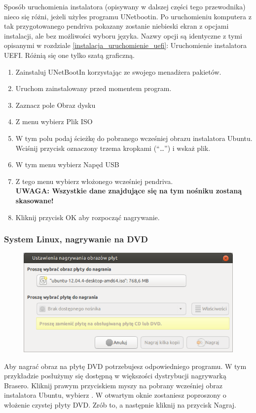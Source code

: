 Sposób uruchomienia instalatora (opisywany w dalszej części tego przewodnika) nieco się różni, jeżeli użyłes programu UNetbootin. Po uruchomieniu komputera z tak przygotowanego pendriva pokazany zostanie niebieski ekran z opcjami instalacji, ale bez możliwości wyboru języka. Nazwy opcji są identyczne z tymi opisanymi w rozdziale \ref{instalacja_uruchomienie_uefi}: Uruchomienie instalatora UEFI. Różnią się one tylko szatą graficzną.
\begin{enumerate}[label=\protect\circled{\arabic*}]
\item Zainstaluj UNetBootIn korzystając ze swojego menadżera pakietów.
\item Uruchom zainstalowany przed momentem program.
\item Zaznacz pole Obraz dysku
\item Z menu wybierz Plik ISO
\item W tym polu podaj ścieżkę do pobranego wcześniej obrazu instalatora Ubuntu. Wciśnij przycisk oznaczony trzema kropkami (“\ldots”) i wskaż plik.
\item W tym menu wybierz Napęd USB
\item Z tego menu wybierz włożonego wcześniej pendriva.\\
\textbf{UWAGA: Wszystkie dane znajdujące się na tym nośniku zostaną skasowane!}
\item Kliknij przycisk \textcolor{ubuntu_orange}{OK} aby rozpocząć nagrywanie.
\end{enumerate}

\subsubsection{System Linux, nagrywanie na DVD}
\begin{figure}
	\vspace{-10pt}
	\includegraphics[width=\linewidth]{images/instalacja_nagrywanie_obrazu_linux_DVD.png}
\end{figure}

Aby nagrać obraz na płytę DVD potrzebujesz odpowiedniego programu. W tym przykładzie posłużymy się dostępną w większości dystrybucji nagrywarką Brasero. Kliknij prawym przyciskiem myszy na pobrany wcześniej obraz instalatora Ubuntu, wybierz
. W otwartym oknie zostaniesz poproszony o włożenie czystej płyty DVD. Zrób to, a następnie kliknij na przycisk \textcolor{ubuntu_orange}{Nagraj}.